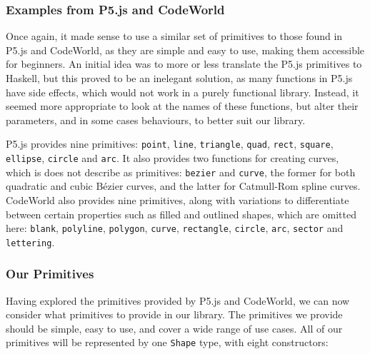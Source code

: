\documentclass[../main.tex]{subfiles}
\begin{document}
            \subsubsection{Examples from P5.js and CodeWorld}
                Once again, it made sense to use a similar set of primitives to those found in
                    P5.js and CodeWorld, as they are simple and easy to use, making them accessible
                    for beginners.
                An initial idea was to more or less translate the P5.js primitives to Haskell,
                    but this proved to be an inelegant solution, as many functions in P5.js have
                    side effects, which would not work in a purely functional library.
                Instead, it seemed more appropriate to look at the names of these functions,
                    but alter their parameters, and in some cases behaviours, to better suit our
                    library.

                P5.js provides nine primitives: \verb|point|, \verb|line|, \verb|triangle|,
                    \verb|quad|, \verb|rect|, \verb|square|, \verb|ellipse|, \verb|circle| and
                    \verb|arc|.
                It also provides two functions for creating curves, which is does not describe
                    as primitives: \verb|bezier| and \verb|curve|, the former for both quadratic
                    and cubic Bézier curves, and the latter for Catmull-Rom spline curves.
                CodeWorld also provides nine primitives, along with variations to differentiate
                    between certain properties such as filled and outlined shapes, which are
                    omitted here: \verb|blank|, \verb|polyline|, \verb|polygon|, \verb|curve|,
                    \verb|rectangle|, \verb|circle|, \verb|arc|, \verb|sector| and
                    \verb|lettering|.

            \subsubsection{Our Primitives}
                Having explored the primitives provided by P5.js and CodeWorld, we can now
                    consider what primitives to provide in our library.
                The primitives we provide should be simple, easy to use, and cover a wide range
                    of use cases.
                All of our primitives will be represented by one \verb|Shape| type, with eight constructors:
\end{document}
